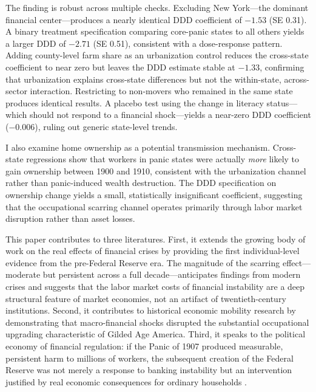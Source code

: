 \documentclass[12pt]{article}
\begin{document}
The finding is robust across multiple checks. Excluding New York---the dominant financial center---produces a nearly identical DDD coefficient of $-1.53$ (SE 0.31). A binary treatment specification comparing core-panic states to all others yields a larger DDD of $-2.71$ (SE 0.51), consistent with a dose-response pattern. Adding county-level farm share as an urbanization control reduces the cross-state coefficient to near zero but leaves the DDD estimate stable at $-1.33$, confirming that urbanization explains cross-state differences but not the within-state, across-sector interaction. Restricting to non-movers who remained in the same state produces identical results. A placebo test using the change in literacy status---which should not respond to a financial shock---yields a near-zero DDD coefficient ($-0.006$), ruling out generic state-level trends.

I also examine home ownership as a potential transmission mechanism. Cross-state regressions show that workers in panic states were actually \textit{more} likely to gain ownership between 1900 and 1910, consistent with the urbanization channel rather than panic-induced wealth destruction. The DDD specification on ownership change yields a small, statistically insignificant coefficient, suggesting that the occupational scarring channel operates primarily through labor market disruption rather than asset losses.

This paper contributes to three literatures. First, it extends the growing body of work on the real effects of financial crises \citep{reinhart2009aftermath, schularick2012credit, calomiris2003fundamentals} by providing the first individual-level evidence from the pre-Federal Reserve era. The magnitude of the scarring effect---moderate but persistent across a full decade---anticipates findings from modern crises and suggests that the labor market costs of financial instability are a deep structural feature of market economies, not an artifact of twentieth-century institutions. Second, it contributes to historical economic mobility research \citep{long2013intergenerational, ferrie1996new, abramitzky2012europe, abramitzky2014nation} by demonstrating that macro-financial shocks disrupted the substantial occupational upgrading characteristic of Gilded Age America. Third, it speaks to the political economy of financial regulation: if the Panic of 1907 produced measurable, persistent harm to millions of workers, the subsequent creation of the Federal Reserve was not merely a response to banking instability but an intervention justified by real economic consequences for ordinary households \citep{gorton1988banking, bordo2000no}.
\end{document}
